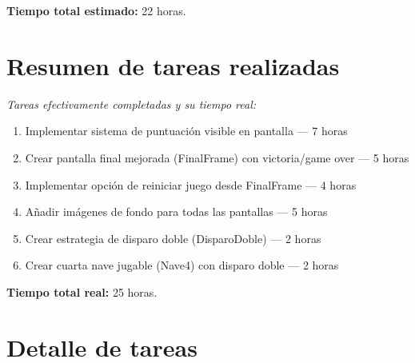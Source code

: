\documentclass[12pt, a4paper]{article}
\begin{document}
\textbf{Tiempo total estimado:} 22 horas.

\vspace{1.5em}

\section{Resumen de tareas realizadas}

\textit{Tareas efectivamente completadas y su tiempo real:}

\begin{enumerate}[leftmargin=2em]
    \item Implementar sistema de puntuación visible en pantalla — 7 horas
    \item Crear pantalla final mejorada (FinalFrame) con victoria/game over — 5 horas
    \item Implementar opción de reiniciar juego desde FinalFrame — 4 horas
    \item Añadir imágenes de fondo para todas las pantallas — 5 horas
    \item Crear estrategia de disparo doble (DisparoDoble) — 2 horas
    \item Crear cuarta nave jugable (Nave4) con disparo doble — 2 horas
\end{enumerate}

\textbf{Tiempo total real:} 25 horas.

\vspace{1.5em}

\section{Detalle de tareas}

\end{document}

